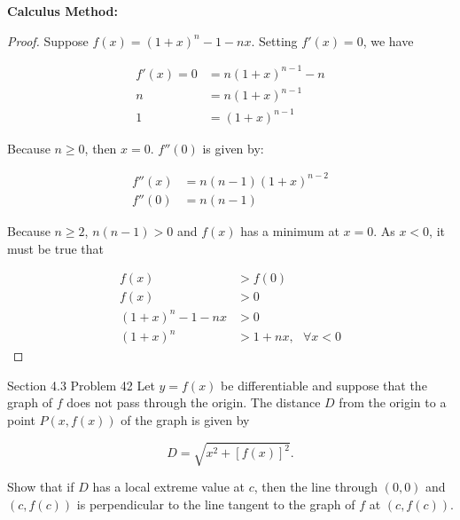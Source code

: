 \documentclass{article}
\begin{document}
    \textbf{Calculus Method:}
    \begin{proof}
        Suppose $f(x) = (1+x)^n - 1 - nx$. Setting $f'(x)=0$, we have

        \begin{align*}
            f'(x) = 0 &= n(1+x)^{n-1}-n \\
                    n &= n(1+x)^{n-1} \\
                    1 &= (1+x)^{n-1}
        \end{align*}

        Because $n\geq 0$, then $x=0$. $f''(0)$ is given by:

        \begin{align*}
            f''(x)  &= n(n-1)(1+x)^{n-2} \\
            f''(0)  &= n(n-1)
        \end{align*}

        Because $n\geq 2$, $n(n-1)>0$ and $f(x)$ has a minimum at $x=0$. As $x<0$, it must be true that

        \begin{align*}
            f(x) &> f(0) \\
            f(x) &> 0 \\
            (1+x)^n - 1 - nx &> 0 \\
            (1+x)^n &> 1 + nx, \text{ } \forall x < 0
        \end{align*}
    \end{proof}

    \begin{tbhtheorem}{Section 4.3 Problem 42}
        Let $y=f(x)$ be differentiable and suppose that the graph of $f$ does not pass through the origin. The distance $D$ from the origin to a point $P(x, f(x))$ of the graph is given by

        \[
            D = \sqrt{x^2 + [f(x)]^2}.
        \]

        Show that if $D$ has a local extreme value at $c$, then the line through $(0,0)$ and $(c,f(c))$ is perpendicular to the line tangent to the graph of $f$ at $(c,f(c))$.
    \end{tbhtheorem}
\end{document}
